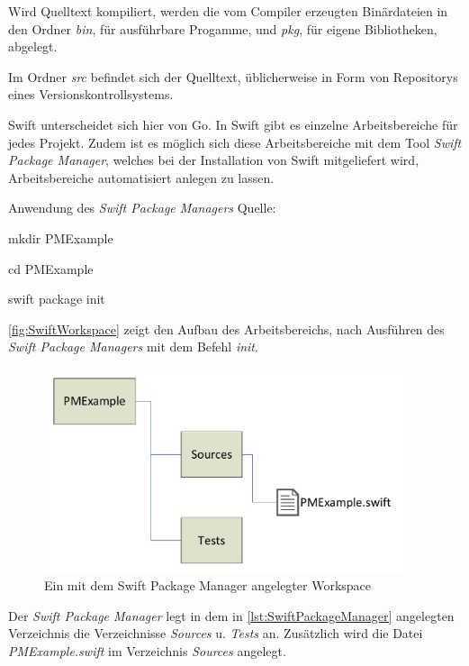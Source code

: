 Wird Quelltext kompiliert, werden die vom Compiler erzeugten Binärdateien in den Ordner \textit{bin}, für ausführbare Progamme, und \textit{pkg}, für eigene Bibliotheken, abgelegt.

Im Ordner \textit{src} befindet sich der Quelltext, üblicherweise in Form von Repositorys eines Versionskontrollsystems.

Swift unterscheidet sich hier von Go. 
In Swift gibt es einzelne Arbeitsbereiche für jedes Projekt. 
Zudem ist es möglich sich diese Arbeitsbereiche mit dem Tool \textit{Swift Package Manager}, welches bei der Installation von Swift mitgeliefert wird, Arbeitsbereiche automatisiert anlegen zu lassen.

\begin{listing}[H]
\caption{Anwendung des \textit{Swift Package Managers} Quelle: \cite[S.22]{Hoffman.2017}}
\label{lst:SwiftPackageManager}
\begin{Commandline}
mkdir PMExample

cd PMExample

swift package init
\end{Commandline}
\end{listing}

\autoref{fig:SwiftWorkspace} zeigt den Aufbau des Arbeitsbereichs, nach Ausführen des \textit{Swift Package Managers} mit dem Befehl \textit{init}. 

\begin{figure}[H]
    \centering
    \includegraphics[height=6cm]{Images/SwiftWorkspace}
    \caption{Ein mit dem Swift Package Manager angelegter Workspace}
    \label{fig:SwiftWorkspace}
\end{figure}

Der \textit{Swift Package Manager} legt in dem in \autoref{lst:SwiftPackageManager} angelegten Verzeichnis die Verzeichnisse \textit{Sources} u. \textit{Tests} an.
Zusätzlich wird die Datei \textit{PMExample.swift} im Verzeichnis \textit{Sources} angelegt.

